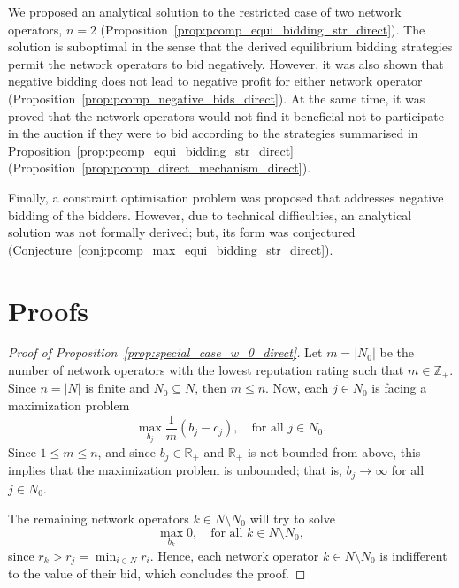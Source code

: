 We proposed an analytical solution to the restricted case of two network operators, $n=2$ (Proposition~\ref{prop:pcomp_equi_bidding_str_direct}). The solution is suboptimal in the sense that the derived equilibrium bidding strategies permit the network operators to bid negatively. However, it was also shown that negative bidding does not lead to negative profit for either network operator (Proposition~\ref{prop:pcomp_negative_bids_direct}). At the same time, it was proved that the network operators would not find it beneficial not to participate in the auction if they were to bid according to the strategies summarised in Proposition~\ref{prop:pcomp_equi_bidding_str_direct} (Proposition~\ref{prop:pcomp_direct_mechanism_direct}).

Finally, a constraint optimisation problem was proposed that addresses negative bidding of the bidders. However, due to technical difficulties, an analytical solution was not formally derived; but, its form was conjectured (Conjecture~\ref{conj:pcomp_max_equi_bidding_str_direct}).

\section{Proofs} %
\label{sec:proofs_direct}
\begin{proof}[Proof of Proposition~\ref{prop:special_case_w_0_direct}]
Let $m = |N_0|$ be the number of network operators with the lowest reputation rating such that $m\in\mathbb{Z}_+$. Since $n = |N|$ is finite and $N_0\subseteq N$, then $m \le n$. Now, each $j\in N_0$ is facing a maximization problem
\begin{equation*}
	\max_{b_j} \frac{1}{m} \left(b_j - c_j \right), \quad\text{for all } j\in N_0.
\end{equation*}
Since $1\le m\le n$, and since $b_j\in\mathbb{R}_+$ and $\mathbb{R}_+$ is not bounded from above, this implies that the maximization problem is unbounded; that is, $b_j\rightarrow\infty$ for all $j\in N_0$.

The remaining network operators $k\in N\setminus N_0$ will try to solve
\begin{equation*}
	\max_{b_k} 0, \quad\text{for all } k\in N\setminus N_0,
\end{equation*}
since $r_k > r_j = \min_{i\in N} r_i$. Hence, each network operator $k\in N\setminus N_0$ is indifferent to the value of their bid, which concludes the proof.
\end{proof}

